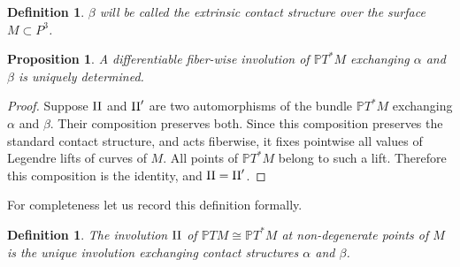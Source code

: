 \documentclass[11pt]{article}
\numberwithin{equation}{section}
\newcounter{count}
\theoremstyle{plain}
\newtheorem{definition}[count]{Definition}
\newtheorem{proposition}[count]{Proposition}
\theoremstyle{remark}
\renewcommand{\P}{\mathbb{P}}
\newcommand{\II}{\textnormal{II}}
\begin{document}
\begin{definition} $\beta$ will be called the \emph{extrinsic contact structure} over the surface $M\subset P^{3}$.
\end{definition}

\begin{proposition} A differentiable fiber-wise involution of $\P T^{*}M$ exchanging $\alpha$ and $\beta$ is uniquely determined.
\end{proposition}

\begin{proof} Suppose $\II$ and $\II'$ are two automorphisms of the bundle $\P T^*M$ exchanging $\alpha$ and $\beta$. Their composition preserves both. Since this composition preserves the standard contact structure, and acts fiberwise, it fixes pointwise all values of Legendre lifts of curves of $M$. All points of $\P T^{*}M$ belong to such a lift. Therefore this composition is the identity, and $\II=\II'$.
\end{proof}

For completeness let us record this definition formally.

\begin{definition} The involution $\II$ of $\P TM\cong \P T^*M$ at non-degenerate points of $M$ is the unique involution exchanging contact structures $\alpha$ and $\beta$.
\end{definition}





\end{document}
